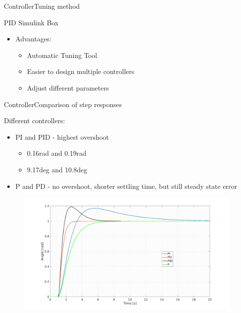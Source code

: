 \begin{frame}{Controller}{Tuning method}
  \begin{block}{PID Simulink Box}

	  \begin{itemize}
	  \item Advantages:
	  \begin{itemize}
	  	\item Automatic Tuning Tool
	  	\item Easier to design multiple controllers
	  	\item Adjust different parameters  	
	  \end{itemize}
	  \end{itemize}

  \end{block}
\end{frame}

\begin{frame}{Controller}{Comparison of step responses}
  \begin{block}{Different controllers:}
  
	  \begin{itemize}
	  	\item PI and PID - highest overshoot
	  		  \begin{itemize}
	  			\item 0.16rad and 0.19rad
	  			\item 9.17deg and 10.8deg
	  			\end{itemize}
	  	\item P and PD - no overshoot, shorter settling time, but still steady state error
	  \end{itemize}

	  \begin{figure}
        \includegraphics[scale=0.15]{../report/figures/full_comp.png}
      \end{figure}
  
  \end{block}
\end{frame}

